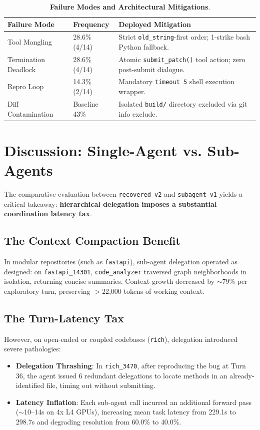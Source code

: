 \documentclass[10pt,twocolumn,letterpaper]{article}
\begin{document}
\begin{table}[h]
\centering
\small
\caption{\textbf{Failure Modes and Architectural Mitigations}.}
\label{tab:failure_summary}
\begin{tabular}{p{2.3cm}p{1.8cm}p{3.1cm}}
\toprule
\textbf{Failure Mode} & \textbf{Frequency} & \textbf{Deployed Mitigation} \\
\midrule
Tool Mangling & 28.6\% (4/14) & Strict \texttt{old\_string}-first order; 1-strike bash Python fallback. \\
Termination Deadlock & 28.6\% (4/14) & Atomic \texttt{submit\_patch()} tool action; zero post-submit dialogue. \\
Repro Loop & 14.3\% (2/14) & Mandatory \texttt{timeout 5} shell execution wrapper. \\
Diff Contamination & Baseline 43\% & Isolated \texttt{build/} directory excluded via git info exclude. \\
\bottomrule
\end{tabular}
\end{table}

\section{Discussion: Single-Agent vs. Sub-Agents}

The comparative evaluation between \texttt{recovered\_v2} and \texttt{subagent\_v1} yields a critical takeaway: \textbf{hierarchical delegation imposes a substantial coordination latency tax}.

\subsection{The Context Compaction Benefit}
In modular repositories (such as \texttt{fastapi}), sub-agent delegation operated as designed: on \texttt{fastapi\_14301}, \texttt{code\_analyzer} traversed graph neighborhoods in isolation, returning concise summaries. Context growth decreased by $\sim$79\% per exploratory turn, preserving $>$22,000 tokens of working context.

\subsection{The Turn-Latency Tax}
However, on open-ended or coupled codebases (\texttt{rich}), delegation introduced severe pathologies:
\begin{itemize}
    \item \textbf{Delegation Thrashing}: In \texttt{rich\_3470}, after reproducing the bug at Turn 36, the agent issued 6 redundant delegations to locate methods in an already-identified file, timing out without submitting.
    \item \textbf{Latency Inflation}: Each sub-agent call incurred an additional forward pass ($\sim$10--14s on 4x L4 GPUs), increasing mean task latency from 229.1s to 298.7s and degrading resolution from 60.0\% to 40.0\%.
\end{itemize}
\end{document}
